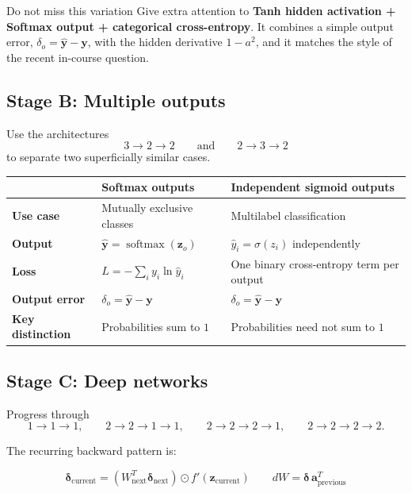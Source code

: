 \documentclass[11pt]{article}
\begin{document}
\begin{prioritybox}{Do not miss this variation}
Give extra attention to \textbf{Tanh hidden activation + Softmax output + categorical cross-entropy}. It combines a simple output error, \(\delta_o=\hat{\boldsymbol y}-\boldsymbol y\), with the hidden derivative \(1-a^2\), and it matches the style of the recent in-course question.
\end{prioritybox}

\subsection{Stage B: Multiple outputs}

Use the architectures
\[
3\!\to\!2\!\to\!2
\qquad\text{and}\qquad
2\!\to\!3\!\to\!2
\]
to separate two superficially similar cases.

\begin{center}
\begin{tabularx}{\textwidth}{>{\bfseries}p{3.1cm} X X}
\toprule
 & Softmax outputs & Independent sigmoid outputs \\
\midrule
Use case & Mutually exclusive classes & Multilabel classification \\
Output & \(\hat{\boldsymbol y}=\operatorname{softmax}(\boldsymbol z_o)\) & \(\hat y_i=\sigma(z_i)\) independently \\
Loss & \(L=-\sum_i y_i\ln\hat y_i\) & One binary cross-entropy term per output \\
Output error & \(\delta_o=\hat{\boldsymbol y}-\boldsymbol y\) & \(\delta_o=\hat{\boldsymbol y}-\boldsymbol y\) \\
Key distinction & Probabilities sum to \(1\) & Probabilities need not sum to \(1\) \\
\bottomrule
\end{tabularx}
\end{center}

\subsection{Stage C: Deep networks}

Progress through
\[
1\!\to\!1\!\to\!1,\qquad
2\!\to\!2\!\to\!1\!\to\!1,\qquad
2\!\to\!2\!\to\!2\!\to\!1,\qquad
2\!\to\!2\!\to\!2\!\to\!2.
\]

The recurring backward pattern is:

\begin{formulabox}
\[
\boxed{
\boldsymbol\delta_{\mathrm{current}}
=
\left(W_{\mathrm{next}}^{T}\boldsymbol\delta_{\mathrm{next}}\right)
\odot f'(\boldsymbol z_{\mathrm{current}})
}
\qquad
\boxed{
dW=\boldsymbol\delta\,\boldsymbol a_{\mathrm{previous}}^{T}
}
\]
\end{formulabox}
\end{document}
